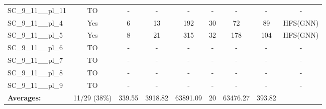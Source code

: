 \documentclass{article}
\begin{document}
\begin{tabular}{lcccccccc}
SC\_9\_11\_\_pl\_11 & TO & - & - & - & - & - & - & - \\
SC\_9\_11\_\_pl\_4 & Yes & 6 & 13 & 192 & 30 & 72 & 89 & HFS(GNN) \\
SC\_9\_11\_\_pl\_5 & Yes & 8 & 21 & 315 & 32 & 178 & 104 & HFS(GNN) \\
SC\_9\_11\_\_pl\_6 & TO & - & - & - & - & - & - & - \\
SC\_9\_11\_\_pl\_7 & TO & - & - & - & - & - & - & - \\
SC\_9\_11\_\_pl\_8 & TO & - & - & - & - & - & - & - \\
SC\_9\_11\_\_pl\_9 & TO & - & - & - & - & - & - & - \\
\textbf{Averages:} & 11/29 (38\%) & 339.55 & 3918.82 & 63891.09 & 20 & 63476.27 & 393.82 & \\
\bottomrule
\end{tabular}
\\[0.7cm]
\end{document}
